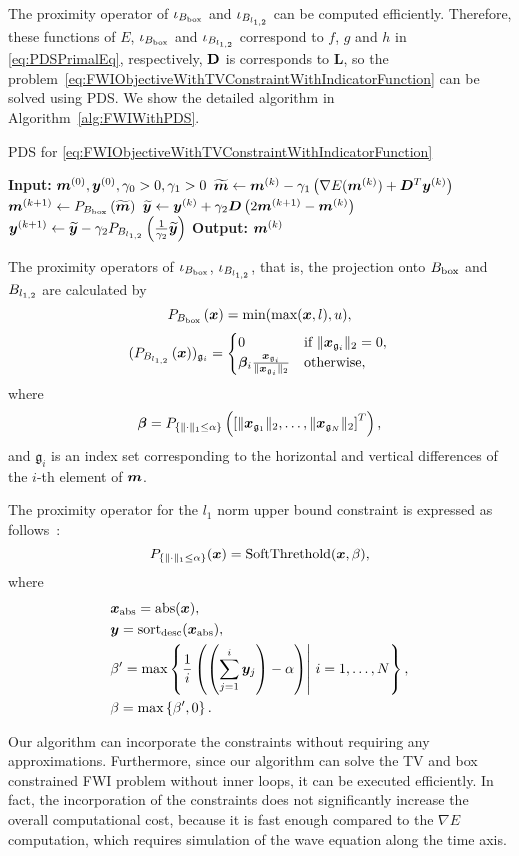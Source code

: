 The proximity operator of $\iota_{B_{\mathrm{box}}}$ and $\iota_{B_{l_{1,2}}}$ can be computed efficiently.
Therefore, these functions of $E$, $\iota_{B_{\mathrm{box}}}$ and $\iota_{B_{l_{1,2}}}$ correspond to $f$, $g$ and $h$ in \eqref{eq:PDSPrimalEq}, respectively, $\mathbf{D}$ is corresponds to $\bm{L}$, so the problem~\eqref{eq:FWIObjectiveWithTVConstraintWithIndicatorFunction} can be solved using PDS.
We show the detailed algorithm in Algorithm~\ref{alg:FWIWithPDS}.
\begin{algorithm}[t]
    \caption{PDS for \eqref{eq:FWIObjectiveWithTVConstraintWithIndicatorFunction}}\label{alg:FWIWithPDS}
    \begin{algorithmic}[1]
        \Statex \textbf{Input:} $ \bm{m}^{(0)}, \bm{y}^{(0)}, \gamma_0 > 0, \gamma_1 > 0 $
            \State $\widetilde{\bm{m}} \leftarrow \bm{m}^{(k)} - \gamma_1 \left( \nabla E(\bm{m}^{(k)}) + \bm{D}^T \bm{y}^{(k)} \right) $
            \State $\bm{m}^{(k+1)}     \leftarrow P_{B_{\mathrm{box}}} \left( \widetilde{\bm{m}} \right) $
            \State $\widetilde{\bm{y}}     \leftarrow \bm{y}^{(k)} + \gamma_2 \bm{D} \left( 2\bm{m}^{(k+1)} - \bm{m}^{(k)} \right) $
            \State $\bm{y}^{(k+1)}         \leftarrow \widetilde{\bm{y}} - \gamma_2 P_{B_{l_{1,2}}}\left(\frac 1 {\gamma_2} {\widetilde{\bm y}}\right) $
        \EndWhile
        \Statex \textbf{Output:} $\bm{m}^{(k)}$
    \end{algorithmic}
\end{algorithm}


The proximity operators of $\iota_{B_{\mathrm{box}}}$, $\iota_{B_{l_{1,2}}}$, that is, the projection onto $B_{\mathrm{box}}$ and ${B_{l_{1,2}}}$ are calculated by
\begin{equation} \label{eq:ProximityOperatorForBoxConstraint} \projBoxSolution, \end{equation}
\begin{equation} \label{eq:ProximityOperatorForL12Ball} \projLOneTwoBallSolution \end{equation}
where
\begin{equation} \label{eq:ProximityOperatorForL12BallWhere} \projLOneTwoBallSolutionWhere, \notag \end{equation}
and $\mathfrak{g}_i$ is an index set corresponding to the horizontal and vertical differences of the $i$-th element of $\bm{m}$.

The proximity operator for the $l_1$ norm upper bound constraint is expressed as follows~\cite{L1-ball-projection}:
\begin{equation} \label{eq:ProximityOperatorForL1Ball}  \projLOneBallSolution, \end{equation}
where
\begin{equation} \label{eq:ProximityOperatorForL1BallWhere} \projLOneBallSolutionWhere \notag \end{equation}

Our algorithm can incorporate the constraints without requiring any approximations.
Furthermore, since our algorithm can solve the TV and box constrained FWI problem without inner loops, it can be executed efficiently.
In fact, the incorporation of the constraints does not significantly increase the overall computational cost, because it is fast enough compared to the $\nabla E$ computation, which requires simulation of the wave equation along the time axis.
